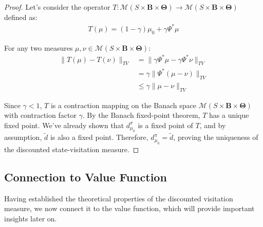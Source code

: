 \documentclass[a4paper,12pt]{report}
\begin{document}
\begin{proof}
    Let's consider the operator
    $T: \mathcal{M}(S \times \boldsymbol{B}\times \boldsymbol{\Theta}) \to \mathcal{M}
        (S \times \boldsymbol{B}\times \boldsymbol{\Theta})$
    defined as:
    \begin{align}
        T(\mu) = (1-\gamma)\mu_{0} + \gamma \Psi^{*} \mu
    \end{align}

    For any two measures
    $\mu, \nu \in \mathcal{M}(S \times \boldsymbol{B}\times \boldsymbol{\Theta})$:
    \begin{align}
        \|T(\mu) - T(\nu)\|_{TV} & = \|\gamma \Psi^{*} \mu - \gamma \Psi^{*} \nu\|_{TV} \\
                                 & = \gamma \|\Psi^{*} (\mu - \nu)\|_{TV}               \\
                                 & \leq \gamma \|\mu - \nu\|_{TV}
    \end{align}

    Since $\gamma < 1$, $T$ is a contraction mapping on the Banach space $\mathcal{M}
        (S \times \boldsymbol{B}\times \boldsymbol{\Theta})$ with contraction factor $\gamma$.
    By the Banach fixed-point theorem, $T$ has a unique fixed point. We've already
    shown that $d^{\pi}_{\mu_0}$ is a fixed point of $T$, and by assumption,
    $\tilde{d}$ is also a fixed point. Therefore, $d^{\pi}_{\mu_0}= \tilde{d}$, proving
    the uniqueness of the discounted state-visitation measure.
\end{proof}

\subsection{Connection to Value Function}
Having established the theoretical properties of the discounted visitation
measure, we now connect it to the value function, which will provide important
insights later on.
\end{document}
